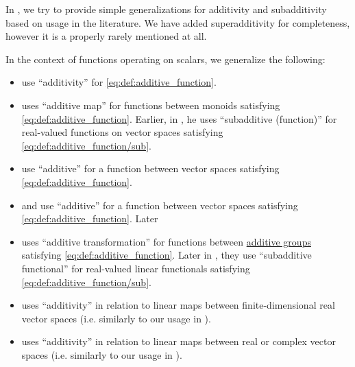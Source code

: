 \begin{remark}\label{rem:additive_function_terminology}
  In , we try to provide simple generalizations for additivity and subadditivity based on usage in the literature. We have added superadditivity for completeness, however it is a properly rarely mentioned at all.

  In the context of functions operating on scalars, we generalize the following:
  \begin{itemize}
    \item {} use \enquote{additivity} for \eqref{eq:def:additive_function}.

    \item {} uses \enquote{additive map} for functions between monoids satisfying \eqref{eq:def:additive_function}. Earlier, in \cite[\S 7.1]{Schechter1997AnalysisHandbook}, he uses \enquote{subadditive (function)} for real-valued functions on vector spaces satisfying \eqref{eq:def:additive_function/sub}.

    \item {} use \enquote{additive} for a function between vector spaces satisfying \eqref{eq:def:additive_function}.

    \item {} and  use \enquote{additive} for a function between vector spaces satisfying \eqref{eq:def:additive_function}. Later \cite[342]{ЛюстерникСоболев1965ФункАнализ}

    \item {} uses \enquote{additive transformation} for functions between \hyperref[con:additive_semigroup]{additive groups} satisfying \eqref{eq:def:additive_function}. Later in \cite[def. 2.5.1]{HillePhillips1996FunctionalAnalysis}, they use \enquote{subadditive functional} for real-valued linear functionals satisfying \eqref{eq:def:additive_function/sub}.

    \item {} uses \enquote{additivity} in relation to linear maps between finite-dimensional real vector spaces (i.e. similarly to our usage in ).

    \item {} uses \enquote{additivity} in relation to linear maps between real or complex vector spaces (i.e. similarly to our usage in ).


\end{itemize}
\end{remark}
